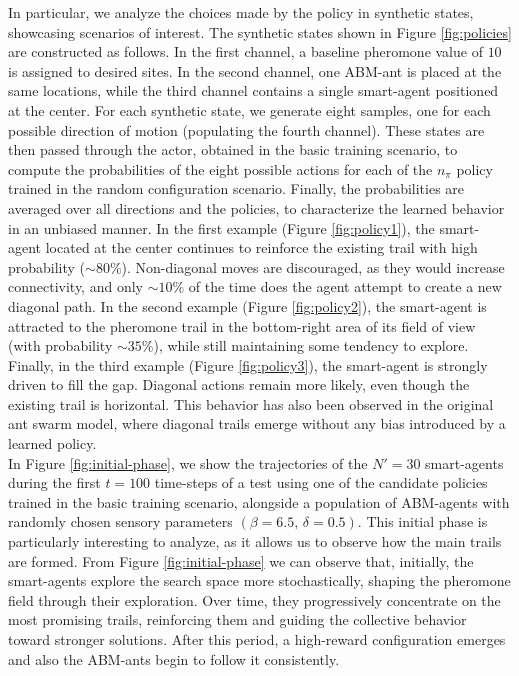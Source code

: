 In particular, we analyze the choices made by the policy in synthetic states, showcasing scenarios of interest. The synthetic states shown in Figure \ref{fig:policies} are constructed as follows. In the first channel, a baseline pheromone value of $10$ is assigned to desired sites. In the second channel, one ABM-ant is placed at the same locations, while the third channel contains a single smart-agent positioned at the center. For each synthetic state, we generate eight samples, one for each possible direction of motion (populating the fourth channel). These states are then passed through the actor, obtained in the basic training scenario, to compute the probabilities of the eight possible actions for each of the $n_\pi$ policy trained in the random configuration scenario. Finally, the probabilities are averaged over all directions and the policies, to characterize the learned behavior in an unbiased manner. In the first example (Figure \ref{fig:policy1}), the smart-agent located at the center continues to reinforce the existing trail with high probability ($\sim 80\%$). Non-diagonal moves are discouraged, as they would increase connectivity, and only $\sim 10\%$ of the time does the agent attempt to create a new diagonal path. In the second example (Figure \ref{fig:policy2}), the smart-agent is attracted to the pheromone trail in the bottom-right area of its field of view (with probability $\sim 35\%$), while still maintaining some tendency to explore. Finally, in the third example (Figure \ref{fig:policy3}), the smart-agent is strongly driven to fill the gap. Diagonal actions remain more likely, even though the existing trail is horizontal. This behavior has also been observed in the original ant swarm model, where diagonal trails emerge without any bias introduced by a learned policy.\\

In Figure \ref{fig:initial-phase}, we show the trajectories of the $N' = 30$ smart-agents during the first $t = 100$ time-steps of a test using one of the candidate policies trained in the basic training scenario, alongside a population of ABM-agents with randomly chosen sensory parameters $(\beta = 6.5, \, \delta = 0.5)$. This initial phase is particularly interesting to analyze, as it allows us to observe how the main trails are formed. From Figure \ref{fig:initial-phase} we can observe that, initially, the smart-agents explore the search space more stochastically, shaping the pheromone field through their exploration. Over time, they progressively concentrate on the most promising trails, reinforcing them and guiding the collective behavior toward stronger solutions. After this period, a high-reward configuration emerges and also the ABM-ants begin to follow it consistently. 

